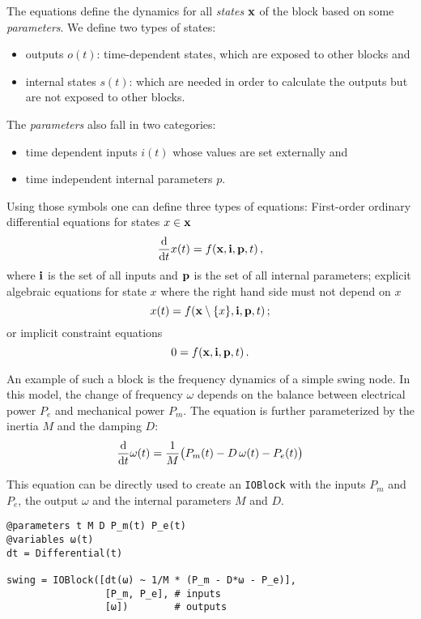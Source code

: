 \documentclass[conference]{IEEEtran}
\begin{document}
The equations define the dynamics for all \emph{states} $\vb x$ of the block based on some \emph{parameters}. We define two types of states:
\begin{itemize}
\item outputs $o(t)$: time-dependent states, which are exposed to other blocks and
\item internal states $s(t)$: which are needed in order to calculate the outputs but are not exposed to other blocks.
\end{itemize}
The \emph{parameters} also fall in two categories:
\begin{itemize}
\item time dependent inputs $i(t)$ whose values are set externally and
\item time independent internal parameters $p$.
\end{itemize}

Using those symbols one can define three types of equations:
First-order ordinary differential equations for states $x \in\vb x$
\begin{equation}
    \dv{t} x(t) = f(\vb x, \vb i, \vb p, t)\,,
\end{equation}
where $\vb i$ is the set of all inputs and $\vb p$ is the set of all internal parameters;
explicit algebraic equations for state $x$ where the right hand side must not depend on $x$
\begin{equation}
  x(t) = f(\vb x\setminus\{x\}, \vb i, \vb p, t)\,;
\end{equation}
or implicit constraint equations
\begin{equation}\label{eq:implicit_constraints}
    0 = f(\vb x, \vb i, \vb p, t)\,.
\end{equation}

An example of such a block is the frequency dynamics of a simple swing node. 
In this model, the change of frequency $\omega$ depends on the balance between electrical power $P_e$ and mechanical power $P_m$. 
The equation is further parameterized by the inertia $M$ and the damping $D$:
\begin{equation}
    \dv{t}\omega(t) = \frac{1}{M}\bigl( P_m(t) - D\,\omega(t) - P_e(t) \bigr)
\end{equation}

This equation can be directly used to create an \texttt{IOBlock} with the inputs $P_m$ and $P_e$, the output $\omega$ and
the internal parameters $M$ and $D$.
\begin{verbatim}
@parameters t M D P_m(t) P_e(t)
@variables ω(t)
dt = Differential(t)

swing = IOBlock([dt(ω) ~ 1/M * (P_m - D*ω - P_e)],
                 [P_m, P_e], # inputs
                 [ω])        # outputs
\end{verbatim}
\end{document}
